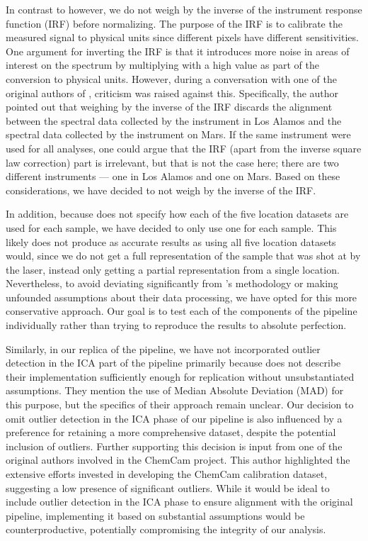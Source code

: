 In contrast to \citet{cleggRecalibrationMarsScience2017} however, we do not weigh by the inverse of the instrument response function (IRF) before normalizing.
The purpose of the IRF is to calibrate the measured signal to physical units since different pixels have different sensitivities\cite{wiensChemcam2012}.
One argument for inverting the IRF is that it introduces more noise in areas of interest on the spectrum by multiplying with a high value as part of the conversion to physical units.
However, during a conversation with one of the original authors of \citet{cleggRecalibrationMarsScience2017}, criticism was raised against this.
Specifically, the author pointed out that weighing by the inverse of the IRF discards the alignment between the spectral data collected by the instrument in Los Alamos and the spectral data collected by the instrument on Mars.
If the same instrument were used for all analyses, one could argue that the IRF (apart from the inverse square law correction) part is irrelevant, but that is not the case here; there are two different instruments --- one in Los Alamos and one on Mars.
Based on these considerations, we have decided to not weigh by the inverse of the IRF.

In addition, because \citet{cleggRecalibrationMarsScience2017} does not specify how each of the five location datasets are used for each sample, we have decided to only use one for each sample.
This likely does not produce as accurate results as using all five location datasets would, since we do not get a full representation of the sample that was shot at by the laser, instead only getting a partial representation from a single location.
Nevertheless, to avoid deviating significantly from \citet{cleggRecalibrationMarsScience2017}'s methodology or making unfounded assumptions about their data processing, we have opted for this more conservative approach.
Our goal is to test each of the components of the pipeline individually rather than trying to reproduce the results to absolute perfection.

Similarly, in our replica of the pipeline, we have not incorporated outlier detection in the ICA part of the pipeline primarily because \citet{cleggRecalibrationMarsScience2017} does not describe their implementation sufficiently enough for replication without unsubstantiated assumptions.
They mention the use of Median Absolute Deviation (MAD) for this purpose, but the specifics of their approach remain unclear.
Our decision to omit outlier detection in the ICA phase of our pipeline is also influenced by a preference for retaining a more comprehensive dataset, despite the potential inclusion of outliers.
Further supporting this decision is input from one of the original authors involved in the ChemCam project.
This author highlighted the extensive efforts invested in developing the ChemCam calibration dataset, suggesting a low presence of significant outliers.
While it would be ideal to include outlier detection in the ICA phase to ensure alignment with the original pipeline, implementing it based on substantial assumptions would be counterproductive, potentially compromising the integrity of our analysis.

